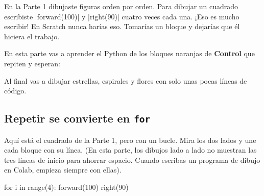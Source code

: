 
En la Parte 1 dibujaste figuras orden por orden. Para dibujar un cuadrado escribiste \py|forward(100)| y \py|right(90)| cuatro veces cada una. ¡Eso es mucho escribir! En Scratch nunca harías eso. Tomarías un bloque  y dejarías que él hiciera el trabajo.

En esta parte vas a aprender el Python de los bloques naranjas de \textbf{Control} que repiten y esperan:

\begin{center}
\quad {}\quad {}\quad {}
\end{center}

Al final vas a dibujar estrellas, espirales y flores con solo unas pocas líneas de código.

\subsection*{Repetir se convierte en \texttt{for}}

Aquí está el cuadrado de la Parte 1, pero con un bucle. Mira los dos lados y une cada bloque con su línea. (En esta parte, los dibujos lado a lado no muestran las tres líneas de inicio para ahorrar espacio. Cuando escribas un programa de dibujo en Colab, empieza siempre con ellas).

\begin{tcbraster}[raster columns=2, raster equal height=rows, raster column skip=12pt, raster valign=center]
\begin{tcolorbox}[colback=white, colframe=white, boxrule=0pt, valign=center]
\begin{scratch}[scale=0.85]
\end{scratch}
\end{tcolorbox}
\begin{code}
for i in range(4):
    forward(100)
    right(90)
\end{code}
\end{tcbraster}

